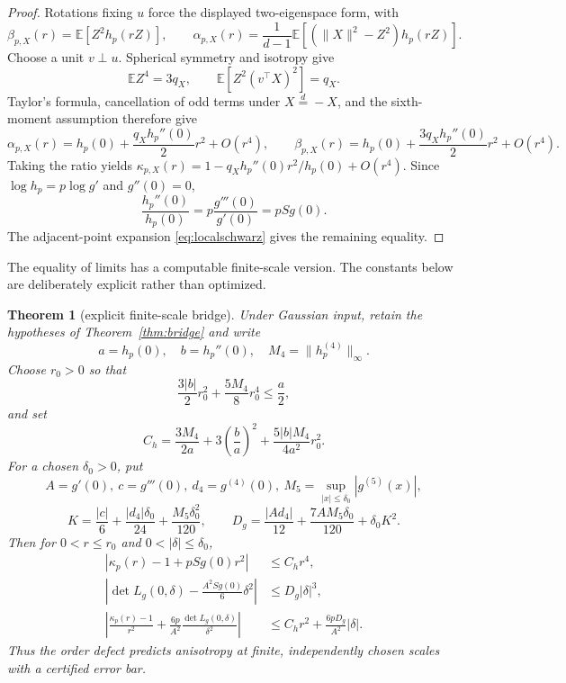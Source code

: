 \documentclass[11pt]{article}
\newtheorem{theorem}{Theorem}[section]
\newcommand{\E}{\mathbb E}
\begin{document}
\begin{proof}
Rotations fixing $u$ force the displayed two-eigenspace form, with
\[
 \beta_{p,X}(r)=\E[Z^2h_p(rZ)],\qquad
 \alpha_{p,X}(r)=\frac1{d-1}
 \E[(\lVert X\rVert^2-Z^2)h_p(rZ)].
\]
Choose a unit $v\perp u$.  Spherical symmetry and isotropy give
\[
 \E Z^4=3q_X,\qquad \E[Z^2(v^\top X)^2]=q_X.
\]
Taylor's formula, cancellation of odd terms under $X\stackrel d=-X$, and the sixth-moment assumption therefore give
\[
 \alpha_{p,X}(r)=h_p(0)+\frac{q_Xh_p''(0)}2r^2+O(r^4),\qquad
 \beta_{p,X}(r)=h_p(0)+\frac{3q_Xh_p''(0)}2r^2+O(r^4).
\]
Taking the ratio yields
$\kappa_{p,X}(r)=1-q_Xh_p''(0)r^2/h_p(0)+O(r^4)$.
Since $\log h_p=p\log g'$ and $g''(0)=0$,
\[
 \frac{h_p''(0)}{h_p(0)}=p\frac{g'''(0)}{g'(0)}=pSg(0).
\]
The adjacent-point expansion \eqref{eq:localschwarz} gives the remaining equality.
\end{proof}

The equality of limits has a computable finite-scale version.  The constants below are deliberately explicit rather
than optimized.

\begin{theorem}[explicit finite-scale bridge]
\label{thm:finitebridge}
Under Gaussian input, retain the hypotheses of Theorem~\ref{thm:bridge} and write
\[
 a=h_p(0),\quad b=h_p''(0),\quad M_4=\lVert h_p^{(4)}\rVert_\infty.
\]
Choose $r_0>0$ so that
\begin{equation}
 \frac{3|b|}{2}r_0^2+\frac{5M_4}{8}r_0^4\le\frac a2,
 \label{eq:r0condition}
\end{equation}
and set
\[
 C_h=\frac{3M_4}{2a}+3\left(\frac ba\right)^2
       +\frac{5|b|M_4}{4a^2}r_0^2.
\]
For a chosen $\delta_0>0$, put
\[
 A=g'(0),\ c=g'''(0),\ d_4=g^{(4)}(0),\
 M_5=\sup_{|x|\le\delta_0}|g^{(5)}(x)|,
\]
\[
 K=\frac{|c|}{6}+\frac{|d_4|\delta_0}{24}
      +\frac{M_5\delta_0^2}{120},\qquad
 D_g=\frac{|Ad_4|}{12}+\frac{7AM_5\delta_0}{120}+\delta_0K^2.
\]
Then for $0<r\le r_0$ and $0<|\delta|\le\delta_0$,
\begin{align}
 \left|\kappa_p(r)-1+pSg(0)r^2\right|&\le C_hr^4,
 \label{eq:quantkappa}\\
 \left|\det L_g(0,\delta)-\frac{A^2Sg(0)}6\delta^2\right|
 &\le D_g|\delta|^3,
 \label{eq:quantloewner}\\
 \left|\frac{\kappa_p(r)-1}{r^2}
 +\frac{6p}{A^2}\frac{\det L_g(0,\delta)}{\delta^2}\right|
 &\le C_hr^2+\frac{6pD_g}{A^2}|\delta|.
 \label{eq:directfinitebridge}
\end{align}
Thus the order defect predicts anisotropy at finite, independently chosen scales with a certified error bar.
\end{theorem}
\end{document}
